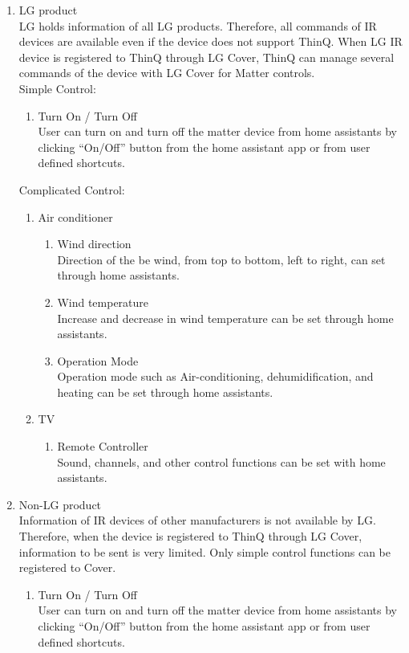 \documentclass[conference]{IEEEtran}
\begin{document}
\begin{enumerate}[label=\arabic*.]
\begin{enumerate}[label=\alph*.]
\item LG product\\
LG holds information of all LG products. Therefore, all commands of IR devices are available even if the device does not support ThinQ. When LG IR device is registered to ThinQ through LG Cover, ThinQ can manage several commands of the device with LG Cover for Matter controls.\\
Simple Control:\\
\begin{enumerate}[label=\roman*.]
\item Turn On / Turn Off\\
User can turn on and turn off the matter device from home assistants by clicking “On/Off” button from the home assistant app or from user defined shortcuts.\\
\end{enumerate}
Complicated Control:\\
\begin{enumerate}[label=\roman*.]
\item Air conditioner
\begin{enumerate}
\item Wind direction\\
Direction of the be wind, from top to bottom, left to right, can set through home assistants.\\
\item Wind temperature\\
Increase and decrease in wind temperature can be set through home assistants.\\
\item Operation Mode\\
Operation mode such as Air-conditioning, dehumidification, and heating can be set through home assistants.\\
\end{enumerate}
\item TV
\begin{enumerate}
\item Remote Controller\\
Sound, channels, and other control functions can be set with home assistants.\\
\end{enumerate}
\end{enumerate}

\item Non-LG product\\
Information of IR devices of other manufacturers is not available by LG. Therefore, when the device is registered to ThinQ through LG Cover, information to be sent is very limited. Only simple control functions can be registered to Cover.\\
\begin{enumerate}[label=\roman*.]
\item Turn On / Turn Off\\
User can turn on and turn off the matter device from home assistants by clicking “On/Off” button from the home assistant app or from user defined shortcuts.\\
\end{enumerate}


\end{enumerate}
\end{enumerate}
\end{document}
